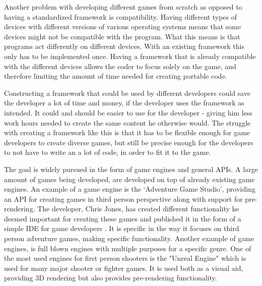 Another problem with developing different games from scratch as opposed to having a standardized framework is compatibility. Having different types of devices with different versions of various operating systems means that some devices might not be compatible with the program. What this means is that programs act differently on different devices. With an existing framework this only has to be implemented once. Having a framework that is already compatible with the different devices allows the coder to focus solely on the game, and therefore limiting the amount of time needed for creating portable code.

Constructing a framework that could be used by different developers could save the developer a lot of time and money, if the developer uses the framework as intended. It could and should be easier to use for the developer - giving him less work hours needed to create the same content he otherwise would. The struggle with creating a framework like this is that it has to be flexible enough for game developers to create diverse games, but still be precise enough for the developers to not have to write an a lot of code, in order to fit it to the game.

The goal is widely pursued in the form of game engines and general APIs. A large amount of games being developed, are developed on top of already existing game engines. An example of a game engine is the `Adventure Game Studio', providing an API for creating games in third person perspective along with support for pre-rendering. The developer, Chris Jones, has created different functionality he deemed important for creating these games and published it in the form of a simple IDE for game developers \cite{adv-game}. It is specific in the way it focuses on third person adventure games, making specific functionality.
Another example of game engines, is full blown engines with multiple purposes for a specific genre. One of the most used engines for first person shooters is the "Unreal Engine" which is used for many major shooter or fighter games. It is used both as a visual aid, providing 3D rendering but also provides pre-rendering functionality.




